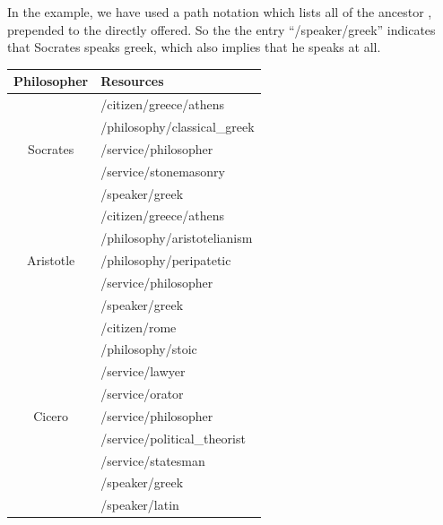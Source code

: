 In the example, we have used a path notation which lists all of the ancestor \resources{}, prepended to the \resource{} directly offered.  So the the entry ``{\sf/speaker/greek}'' indicates that Socrates speaks greek, which also implies that he speaks at all.

\begin{table}
	\begin{center}
		\begin{tabular}{| c | l |}
			\hline
			  Philosopher & Resources \\
			\hline
			\hline
			  \multirow{5}{*}{Socrates}              & /citizen/greece/athens \\
			                                         & /philosophy/classical\_greek \\
			                                         & /service/philosopher \\
			                                         & /service/stonemasonry \\
			                                         & /speaker/greek \\
			\hline
			  \multirow{5}{*}{Aristotle}             & /citizen/greece/athens \\
			                                         & /philosophy/aristotelianism \\
			                                         & /philosophy/peripatetic \\
			                                         & /service/philosopher \\
			                                         & /speaker/greek \\
			\hline
			  \multirow{9}{*}{Cicero}                & /citizen/rome \\
			                                         & /philosophy/stoic \\
			                                         & /service/lawyer \\
			                                         & /service/orator \\
			                                         & /service/philosopher \\
			                                         & /service/political\_theorist \\
			                                         & /service/statesman \\
			                                         & /speaker/greek \\
			                                         & /speaker/latin \\

\end{tabular}
\end{center}
\end{table}
